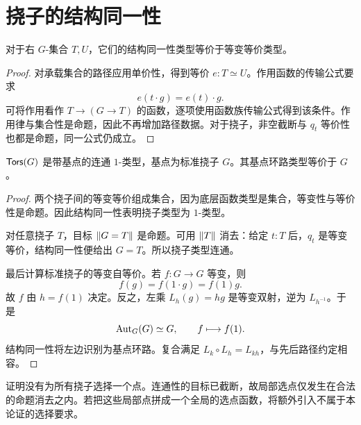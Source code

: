 \section{挠子的结构同一性}
\begin{lemma}
对于右 $G$-集合 $T,U$，它们的结构同一性类型等价于等变等价类型。
\end{lemma}
\begin{proof}
对承载集合的路径应用单价性，得到等价 $e:T\simeq U$。作用函数的传输公式要求
\[
e(t\cdot g)=e(t)\cdot g.
\]
可将作用看作 $T\to(G\to T)$ 的函数，逐项使用函数族传输公式得到该条件。作用律与集合性是命题，因此不再增加路径数据。对于挠子，非空截断与 $q_t$ 等价性也都是命题，同一公式仍成立。
\end{proof}
\begin{theorem}[挠子分类空间]\label{thm:torsor-BG}
$\mathsf{Tors}(G)$ 是带基点的连通 $1$-类型，基点为标准挠子 $G$。其基点环路类型等价于 $G$。
\end{theorem}
\begin{proof}
两个挠子间的等变等价组成集合，因为底层函数类型是集合，等变性与等价性是命题。因此结构同一性表明挠子类型为 $1$-类型。

对任意挠子 $T$，目标 $\left\|G=T\right\|$ 是命题。可用 $\left\|T\right\|$ 消去：给定 $t:T$ 后，$q_t$ 是等变等价，结构同一性便给出 $G=T$。所以挠子类型连通。

最后计算标准挠子的等变自等价。若 $f:G\to G$ 等变，则
\[
f(g)=f(1\cdot g)=f(1)g.
\]
故 $f$ 由 $h=f(1)$ 决定。反之，左乘 $L_h(g)=hg$ 是等变双射，逆为 $L_{h^{-1}}$。于是
\[
\operatorname{Aut}_G(G)\simeq G,
\qquad f\longmapsto f(1).
\]
结构同一性将左边识别为基点环路。复合满足 $L_k\circ L_h=L_{kh}$，与先后路径约定相容。
\end{proof}
\begin{remark}
证明没有为所有挠子选择一个点。连通性的目标已截断，故局部选点仅发生在合法的命题消去之内。若把这些局部点拼成一个全局的选点函数，将额外引入不属于本论证的选择要求。
\end{remark}

